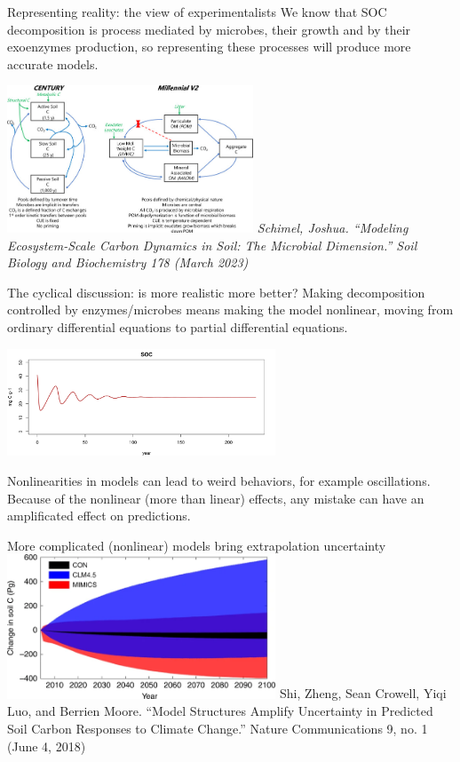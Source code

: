 \documentclass[
  ignorenonframetext,
]{beamer}
\begin{document}
\begin{frame}{Representing reality: the view of experimentalists}
\protect\hypertarget{representing-reality-the-view-of-experimentalists-1}{}
We know that SOC decomposition is process mediated by microbes, their
growth and by their exoenzymes production, so representing these
processes will produce more accurate models.

\includegraphics[width=0.55\textwidth,height=\textheight]{Schimel2.jpg}
\emph{Schimel, Joshua. ``Modeling Ecosystem-Scale Carbon Dynamics in
Soil: The Microbial Dimension.'' Soil Biology and Biochemistry 178
(March 2023)}
\end{frame}

\begin{frame}{The cyclical discussion: is more realistic more better?}
\protect\hypertarget{the-cyclical-discussion-is-more-realistic-more-better}{}
Making decomposition controlled by enzymes/microbes means making the
model nonlinear, moving from ordinary differential equations to partial
differential equations.

\includegraphics[width=0.6\textwidth,height=\textheight]{SOC.png}

Nonlinearities in models can lead to weird behaviors, for example
oscillations. Because of the nonlinear (more than linear) effects, any
mistake can have an amplificated effect on predictions.
\end{frame}

\begin{frame}{More complicated (nonlinear) models bring extrapolation
uncertainty}
\protect\hypertarget{more-complicated-nonlinear-models-bring-extrapolation-uncertainty}{}
\includegraphics[width=0.6\textwidth,height=\textheight]{Zheng_et_al.png}
Shi, Zheng, Sean Crowell, Yiqi Luo, and Berrien Moore. ``Model
Structures Amplify Uncertainty in Predicted Soil Carbon Responses to
Climate Change.'' Nature Communications 9, no. 1 (June 4, 2018)
\end{frame}
\end{document}
